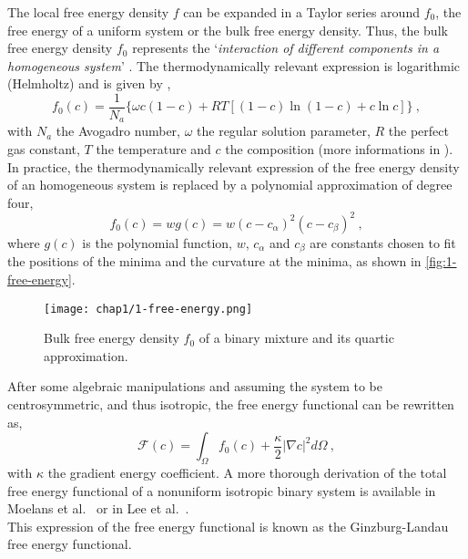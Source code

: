     The local free energy density $f$ can be expanded in a Taylor series around $f_0$, the free energy of a uniform system or the bulk free energy density. Thus, the bulk free energy density $f_0$ represents the `\textit{interaction of different components in a homogeneous system}' \cite{Wu2022}. The thermodynamically relevant expression is logarithmic (Helmholtz) and is given by \cite{LeeHuhJeongShinYunKim2014},
    \begin{equation}
        f_0(c) = \frac{1}{N_a}\{\omega c (1-c) + RT \left[(1-c)\ln{(1-c)} + c \ln{c}\right]\}
        \label{eq:1-free-energy}\ ,
    \end{equation}
    with $N_a$ the Avogadro number, $\omega$ the regular solution parameter, $R$ the perfect gas constant, $T$ the temperature and $c$ the composition (more informations in \cite{LeeHuhJeongShinYunKim2014}).\\
    In practice, the thermodynamically relevant expression of the free energy density of an homogeneous system is replaced by a polynomial approximation of degree four,
   \begin{equation}
        f_0(c) = w g(c) = w (c-c_\alpha)^2 (c-c_\beta)^2\ ,
   \end{equation}
   where $g(c)$ is the polynomial function, $w$, $c_\alpha$ and $c_\beta$ are constants chosen to fit the positions of the minima and the curvature at the minima, as shown in \autoref{fig:1-free-energy}.
    \begin{figure}[H]
        \centering
        \texttt{[image: chap1/1-free-energy.png]}
        \caption{Bulk free energy density $f_0$ of a binary mixture and its quartic approximation. \cite{LeeHuhJeongShinYunKim2014}}
        \label{fig:1-free-energy}
    \end{figure}
    After some algebraic manipulations and assuming the system to be centrosymmetric, and thus isotropic, the free energy functional can be rewritten as,
    \begin{equation}
        \mathcal{F}(c) =\int_\Omega f_0(c) + \frac{\kappa}{2} |\nabla c|^2 d\Omega \ ,
    \end{equation}
    with $\kappa$ the gradient energy coefficient. A more thorough derivation of the total free energy functional of a nonuniform isotropic binary system is available in Moelans et al.~\cite{MoelansBlanpainWollants2008} or in Lee et al.~\cite{LeeHuhJeongShinYunKim2014}.\\
    This expression of the free energy functional is known as the Ginzburg-Landau \cite{LeeHuhJeongShinYunKim2014,Voorhees2018,MoelansBlanpainWollants2008} free energy functional. 
